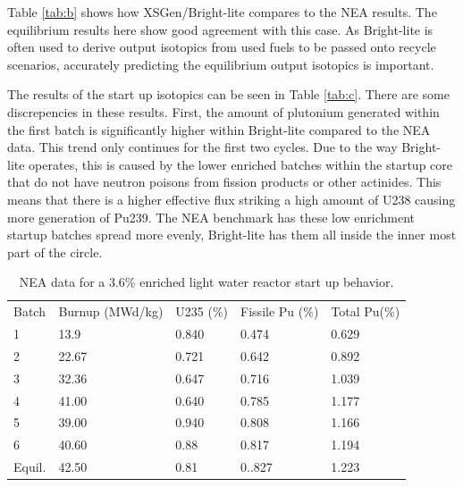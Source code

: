 \documentclass{article}
\begin{document}
Table \ref{tab:b} shows how XSGen/Bright-lite compares to the NEA results. The equilibrium results here show good agreement with this case. As Bright-lite is often used to derive output isotopics from used fuels to be passed onto recycle scenarios, accurately predicting the equilibrium output isotopics is important. 

The results of the start up isotopics can be seen in Table \ref{tab:c}. There are some discrepencies in these results. First, the amount of plutonium generated within the first batch is significantly higher within Bright-lite compared to the NEA data. This trend only continues for the first two cycles. Due to the way Bright-lite operates, this is caused by the lower enriched batches within the startup core that do not have neutron poisons from fission products or other actinides. This means that there is a higher effective flux striking a high amount of U238 causing more generation of Pu239. The NEA benchmark has these low enrichment startup batches spread more evenly, Bright-lite has them all inside the inner most part of the circle. 

\begin{table}[!htb]
\centering
\caption{NEA data for a 3.6\% enriched light water reactor start up behavior.}
\label{tab:d}
\begin{tabular}{lllll}
Batch & Burnup (MWd/kg) & U235 (\%) & Fissile Pu (\%) & Total Pu(\%) \\
1 & 13.9 & 0.840 & 0.474 & 0.629 \\
2 & 22.67 & 0.721 & 0.642 & 0.892 \\
3 & 32.36 & 0.647 & 0.716 & 1.039 \\
4 & 41.00 & 0.640 & 0.785 & 1.177 \\
5 & 39.00 & 0.940 & 0.808 & 1.166 \\
6 & 40.60 & 0.88 & 0.817 & 1.194 \\
Equil. & 42.50 & 0.81 & 0..827 & 1.223
\end{tabular}
\end{table}
\end{document}
